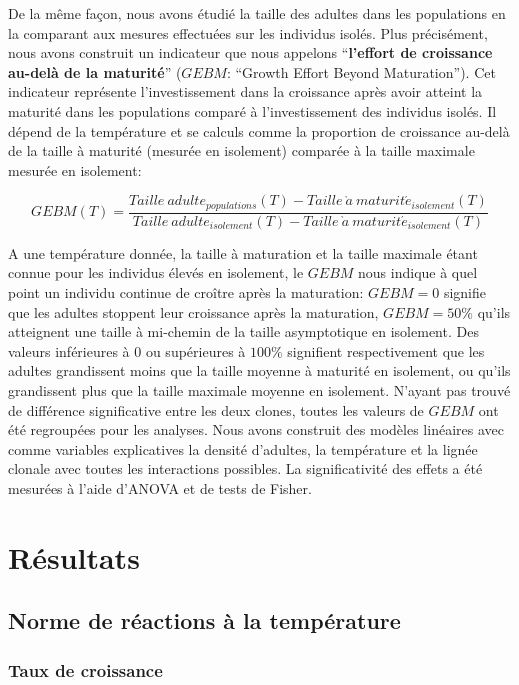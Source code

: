 De la même façon, nous avons étudié la taille des adultes dans les populations
en la comparant aux mesures effectuées sur les individus isolés. Plus
précisément, nous avons construit un indicateur que nous appelons
``\textbf{l'effort de croissance au-delà de la maturité}'' ($GEBM$: ``Growth
Effort Beyond Maturation''). Cet indicateur représente l'investissement dans la
croissance après avoir atteint la maturité dans les populations comparé
à l'investissement des individus isolés. Il dépend de la température et se
calculs comme la proportion de croissance au-delà de la taille à maturité (mesurée en
isolement) comparée à la taille maximale mesurée en isolement:

\begin{equation}
GEBM(T) = \frac{Taille\ adulte_{populations}(T) -
Taille\ \grave{a} \ maturit\acute{e}_{isolement}(T)}{Taille\ adulte_{isolement}(T) -
Taille\ \grave{a} \ maturit\acute{e}_{isolement}(T)}
\end{equation}

A une température donnée, la taille à maturation et la taille maximale étant
connue pour les individus élevés en isolement, le $GEBM$ nous indique à quel
point un individu continue de croître après la maturation: $GEBM=0$ signifie que
les adultes stoppent leur croissance après la maturation, $GEBM=50\%$ qu'ils
atteignent une taille à mi-chemin de la taille asymptotique en isolement. Des
valeurs inférieures à 0 ou supérieures à $100\%$ signifient respectivement que
les adultes grandissent moins que la taille moyenne à maturité en isolement, ou
qu'ils grandissent plus que la taille maximale moyenne en isolement. N'ayant pas
trouvé de différence significative entre les deux clones, toutes les valeurs de
$GEBM$ ont été regroupées pour les analyses. Nous avons construit des modèles
linéaires avec comme variables explicatives la densité d'adultes, la
température et la lignée clonale avec toutes les interactions possibles. La
significativité des effets a été mesurées à l'aide d'ANOVA et de tests de
Fisher.

\section{Résultats}

\subsection{Norme de réactions à la température}

\subsubsection{Taux de croissance}

